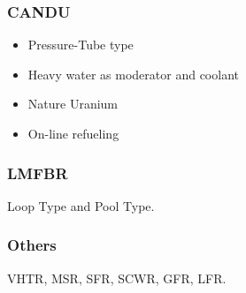 \subsubsection*{CANDU}

\begin{itemize}
    \item Pressure-Tube type
    \item Heavy water as moderator and coolant
    \item Nature Uranium
    \item On-line refueling
\end{itemize}

\subsubsection*{LMFBR}

Loop Type and Pool Type.

\subsubsection*{Others}

VHTR, MSR, SFR, SCWR, GFR, LFR.